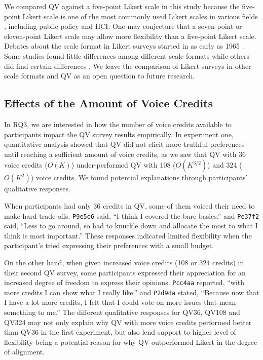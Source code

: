 We compared QV against a five-point Likert scale in this study because the five-point Likert scale is one of the most commonly used Likert scales in various fields \cite{malhotra2006basic}, including public policy and HCI. One may conjecture that a seven-point or eleven-point Likert scale may allow more flexibility than a five-point Likert scale. Debates about the scale format in Likert surveys started in as early as 1965 \cite{komorita1965number}. Some studies found little differences among different scale formats while others did find certain differences \cite{dawes2008data}. We leave the comparison of Likert surveys in other scale formats and QV as an open question to future research.

\subsection{Effects of the Amount of Voice Credits}
In RQ3, we are interested in how the number of voice credits available to participants impact the QV survey results empirically. In experiment one, quantitative analysis showed that QV did not elicit more truthful preferences until reaching a sufficient amount of voice credits, as we saw that QV with 36 voice credits ($O(K)$) under-performed QV with 108 ($O(K^{3/2})$) and 324 ($O(K^{2})$) voice credits. We found potential explanations through participants' qualitative responses. 

When participants had only 36 credits in QV, some of them voiced their need to make hard trade-offs. \texttt{P9e5e6} said, ``I think I covered the bare basics.'' and \texttt{Pe37f2} said, ``Less to go around, so had to knuckle down and allocate the most to what I think is most important.'' These responses indicated limited flexibility when the participant's tried expressing their preferences with a small budget.

On the other hand, when given increased voice credits (108 or 324 credits) in their second QV survey, some participants expressed their appreciation for an increased degree of freedom to express their opinions. \texttt{Pcc4aa} reported, ``with more credits I can show what I really like.'' and \texttt{P2d9da} stated, ``Because now that I have a lot more credits, I felt that I could vote on more issues that mean something to me.'' The different qualitative responses for QV36, QV108 and QV324 may not only explain why QV with more voice credits performed better than QV36 in the first experiment, but also lend support to higher level of flexibility being a potential reason for why QV outperformed Likert in the degree of alignment. 

